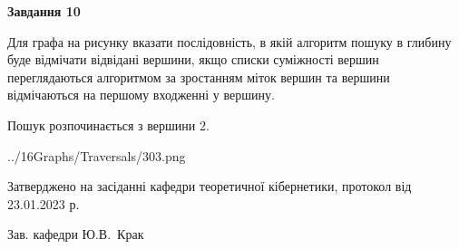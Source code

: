 \documentclass[12pt, ukrainian]{article}
\begin{document}
{\begin {large}
{\begin {center}\textbf{Завдання 10}\end {center}}\par
Для графа на рисунку вказати послідовність, в якій алгоритм пошуку в глибину буде відмічати відвідані вершини, якщо списки суміжності вершин переглядаються алгоритмом за зростанням міток вершин та вершини відмічаються на першому вход\-женні у вершину.\par
Пошук розпочинається з вершини 2.\par

\begin{center}
	{../16Graphs/Traversals/303.png}
\end{center}\par
\newpage


\end {large}
}
{\smallskip \begin {small} Затверджено на засіданні кафедри теоретичної кібернетики, протокол  від   23.01.2023 р.\par\smallskip\smallskip
{\parbox {6.5 cm}{Зав. кафедри \dotfill Ю.В.~Крак}} \end{small}}
\end{document}

